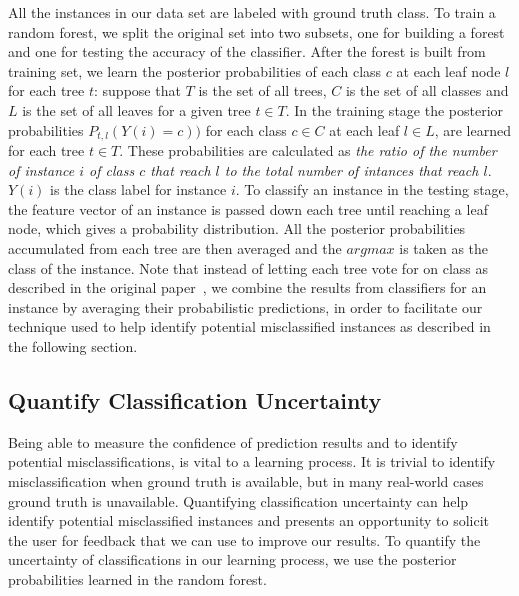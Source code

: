 All the instances in our data set are labeled with ground truth class. To train a random forest, we split the original set into two subsets, one for building 
a forest and one for testing the accuracy of the classifier. After the forest is built from training set, we learn the posterior probabilities of each class $c$ 
at each leaf node $l$ for each tree $t$: suppose that $T$ is the set of all trees, $C$ is the set of all classes and $L$ is the set of all leaves for a given 
tree $t\in T$. In the training stage the posterior probabilities $P_{t,l}(Y(i) = c))$ for each class $c\in C$ at each leaf $l\in L$, are learned for each tree $t\in T$. 
These probabilities are calculated as \textit{the ratio of the number of instance $i$ of class $c$ that reach $l$ to the total number of intances that reach $l$}. $Y(i)$ 
is the class label for instance $i$. To classify an instance in the testing stage, the feature vector of an instance is passed down each tree until reaching a leaf 
node, which gives a probability distribution. All the posterior probabilities accumulated from each tree are then averaged and the $argmax$ is taken as the class 
of the instance. Note that instead of letting each tree vote for on class as described in the original paper~\cite{RF}, we combine the results from classifiers for 
an instance by averaging their probabilistic predictions, in order to facilitate our technique used to help identify potential misclassified instances as described in the following section.  


\subsection{Quantify Classification Uncertainty}
Being able to measure the confidence of prediction results and to identify potential misclassifications, is vital to a learning process. 
It is trivial to 
identify misclassification when ground truth is available, but in many real-world cases ground truth is unavailable. %
Quantifying classification uncertainty can help identify potential misclassified instances and presents an opportunity to solicit 
the user for feedback that we can use to improve our results. To quantify the uncertainty of classifications in our learning process, we use
 the posterior probabilities learned in the random forest.

